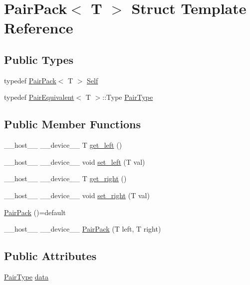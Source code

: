 \hypertarget{structPairPack}{\section{Pair\-Pack$<$ T $>$ Struct Template Reference}
\label{structPairPack}
}
\subsection*{Public Types}
\begin{DoxyCompactItemize}
\item 
typedef \hyperlink{structPairPack}{Pair\-Pack}$<$ T $>$ \hyperlink{structPairPack_aa208c22c3bba7a849ec3039e93a8216d}{Self}
\item 
typedef \hyperlink{structPairEquivalent}{Pair\-Equivalent}$<$ T $>$\-::Type \hyperlink{structPairPack_a53b73bc7e25b709c22cc92e2d0705512}{Pair\-Type}
\end{DoxyCompactItemize}
\subsection*{Public Member Functions}
\begin{DoxyCompactItemize}
\item 
\-\_\-\-\_\-host\-\_\-\-\_\- \-\_\-\-\_\-device\-\_\-\-\_\- T \hyperlink{structPairPack_adeb586bebb73250e0e1f841d58b0525a}{get\-\_\-left} ()
\item 
\-\_\-\-\_\-host\-\_\-\-\_\- \-\_\-\-\_\-device\-\_\-\-\_\- void \hyperlink{structPairPack_aa67336e25247c5e0ba519b2345fba8e4}{set\-\_\-left} (T val)
\item 
\-\_\-\-\_\-host\-\_\-\-\_\- \-\_\-\-\_\-device\-\_\-\-\_\- T \hyperlink{structPairPack_a72b758cfbf4326b00d0cca031c8d75fa}{get\-\_\-right} ()
\item 
\-\_\-\-\_\-host\-\_\-\-\_\- \-\_\-\-\_\-device\-\_\-\-\_\- void \hyperlink{structPairPack_af4c9d3dc540eecffdf01f65369d28d17}{set\-\_\-right} (T val)
\item 
\hyperlink{structPairPack_a4bd49f26b138ba73879f17beb50d531a}{Pair\-Pack} ()=default
\item 
\-\_\-\-\_\-host\-\_\-\-\_\- \-\_\-\-\_\-device\-\_\-\-\_\- \hyperlink{structPairPack_a8e38175584a3eec687fc34570f3c1401}{Pair\-Pack} (T left, T right)
\end{DoxyCompactItemize}
\subsection*{Public Attributes}
\begin{DoxyCompactItemize}
\item 
\hyperlink{structPairPack_a53b73bc7e25b709c22cc92e2d0705512}{Pair\-Type} \hyperlink{structPairPack_a9ce2994d26fae9c01124ef4ecc9db90e}{data}
\end{DoxyCompactItemize}
